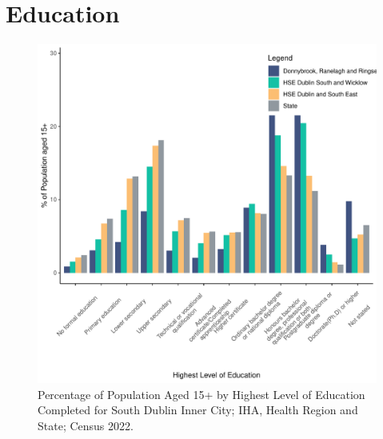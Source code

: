 \documentclass{article}
\begin{document}
\section{Education}\label{sect:Edu}
\begin{figure}[H]
	\centering
	\includegraphics[width = 120mm]{../figures/EduED.pdf}
	\caption{Percentage of Population Aged 15+ by Highest Level of Education Completed for South Dublin Inner City; IHA, Health Region and State; Census 2022.}
	\label{fig:vbnv}
	\end{figure}
\end{document}
